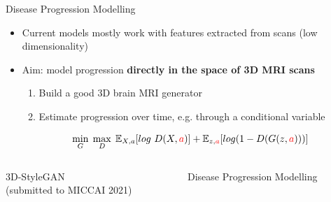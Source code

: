 \documentclass[8pt,xcolor=table,aspectratio=169]{beamer}
\begin{document}
\begin{frame}{Disease Progression Modelling}

\begin{itemize}
\item Current models mostly work with features extracted from scans (low dimensionality)
\item Aim: model progression \textbf{directly in the space of 3D MRI scans}
\begin{enumerate}
  \item Build a good 3D brain MRI generator
  \item Estimate progression over time, e.g. through a conditional variable
\end{enumerate}
   $$\min_G\; \max_D\; \mathbb{E}_{X,a}[log\ D(X,\tct{a})] + \mathbb{E}_{z,\tct{a}}[log (1 - D(G(z,\tct{a})))] $$
\end{itemize}

\vo

\begin{columns}
\begin{column}{0.5\textwidth}
\centering
{} 3D-StyleGAN
 \\
(submitted to MICCAI 2021)
\end{column}
\begin{column}{0.5\textwidth}
\centering
{} Disease Progression Modelling
 
\end{column}
\end{columns}


\end{frame}
\end{document}
